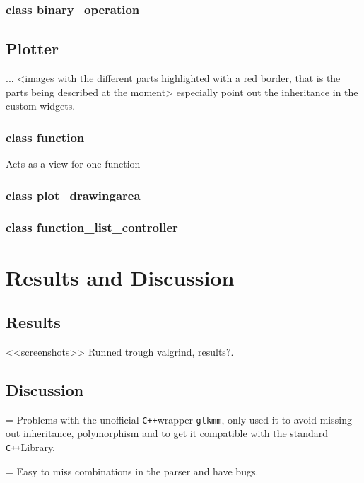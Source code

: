 \documentclass[a4paper,11pt]{kth-mag}
\newcommand{\Cpp}{\texttt{C++}}
\newcommand{\Gtkmm}{\texttt{gtkmm}}
\begin{document}
\subsection{class binary\_operation}

\section{Plotter}
...
<images with the different parts highlighted with a red border, that is the parts being described at the moment>
especially point out the inheritance in the custom widgets.


\subsection{class function}
Acts as a view for one function

\subsection{class plot\_drawingarea}
\subsection{class function\_list\_controller}



\chapter{Results and Discussion}

\section{Results}
<<screenshots>>
Runned trough valgrind, results?.

\section{Discussion}
 = Problems with the unofficial \Cpp wrapper \Gtkmm, only used it to avoid missing out inheritance, polymorphism and to get it compatible with the standard \Cpp Library. 
 
 = Easy to miss combinations in the parser and have bugs.
\end{document}
